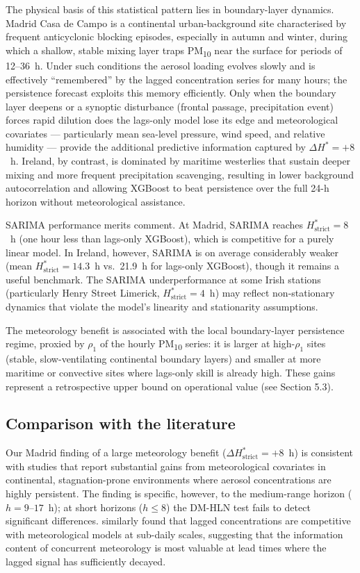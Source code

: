 \documentclass[12pt,a4paper]{article}
\newcommand{\PMten}{PM\textsubscript{10}}
\begin{document}
The physical basis of this statistical pattern lies in boundary-layer dynamics.
Madrid Casa de Campo is a continental urban-background site characterised by
frequent anticyclonic blocking episodes, especially in autumn and winter,
during which a shallow, stable mixing layer traps \PMten{} near the surface
for periods of 12--36~h.  Under such conditions the aerosol loading evolves
slowly and is effectively ``remembered'' by the lagged concentration series for
many hours; the persistence forecast exploits this memory efficiently.  Only
when the boundary layer deepens or a synoptic disturbance (frontal passage,
precipitation event) forces rapid dilution does the lags-only model lose its
edge and meteorological covariates — particularly mean sea-level pressure,
wind speed, and relative humidity — provide the additional predictive
information captured by $\Delta H^* = +8$~h.  Ireland, by contrast, is
dominated by maritime westerlies that sustain deeper mixing and more frequent
precipitation scavenging, resulting in lower background autocorrelation and
allowing XGBoost to beat persistence over the full 24-h horizon without
meteorological assistance.

SARIMA performance merits comment.  At Madrid, SARIMA reaches
$H^*_{\text{strict}} = 8$~h (one hour less than lags-only XGBoost), which
is competitive for a purely linear model.  In Ireland, however, SARIMA
is on average considerably weaker (mean $H^*_{\text{strict}} = 14.3$~h vs.\
21.9~h for lags-only XGBoost), though it remains a useful benchmark.  The
SARIMA underperformance at some Irish stations (particularly Henry Street
Limerick, $H^*_{\text{strict}} = 4$~h) may reflect non-stationary dynamics
that violate the model's linearity and stationarity assumptions.

The meteorology benefit is associated with the local boundary-layer
persistence regime, proxied by $\rho_1$ of the hourly \PMten{} series: it is
larger at high-$\rho_1$ sites (stable, slow-ventilating continental boundary
layers) and smaller at more maritime or convective sites where lags-only skill
is already high. These gains represent a retrospective upper bound on operational value (see Section 5.3).

\subsection{Comparison with the literature}

Our Madrid finding of a large meteorology benefit ($\Delta H^*_{\text{strict}}
= +8$~h) is consistent with studies that report substantial gains from
meteorological covariates in continental, stagnation-prone environments where
aerosol concentrations are highly persistent.  The finding is specific,
however, to the medium-range horizon ($h = 9$--$17$~h); at short horizons
($h \le 8$) the DM-HLN test fails to detect significant differences.
\citet{Bai2018} similarly found that lagged concentrations are competitive
with meteorological models at sub-daily scales, suggesting that the
information content of concurrent meteorology is most valuable at lead times
where the lagged signal has sufficiently decayed.
\end{document}
